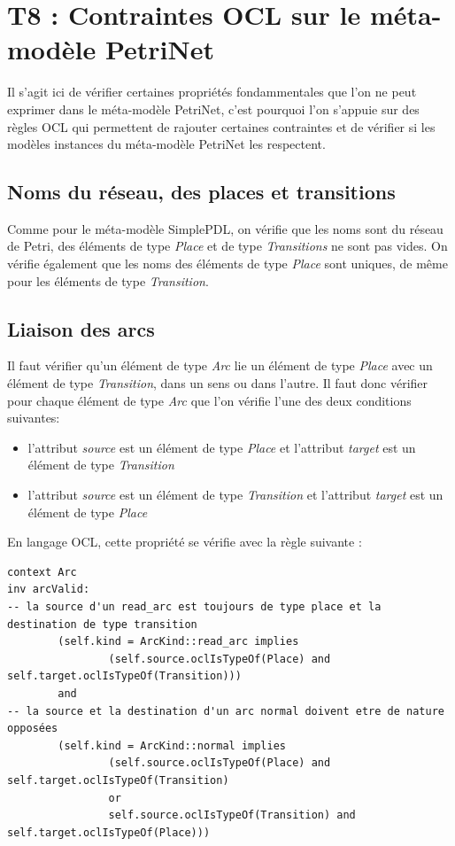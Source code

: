 \documentclass{report}
\begin{document}
\section{T8 : Contraintes OCL sur le méta-modèle PetriNet}
Il s'agit ici de vérifier certaines propriétés fondammentales que l'on ne peut exprimer dans le méta-modèle PetriNet, c'est pourquoi l'on s'appuie sur des règles OCL qui permettent de rajouter certaines contraintes et de vérifier si les modèles instances du méta-modèle PetriNet les respectent.\\

\subsection{Noms du réseau, des places et transitions}
Comme pour le méta-modèle SimplePDL, on vérifie que les noms sont du réseau de Petri, des éléments de type \textit{Place} et de type \textit{Transitions} ne sont pas vides. On vérifie également que les noms des éléments de type \textit{Place} sont uniques, de même pour les éléments de type \textit{Transition}.

\subsection{Liaison des arcs}
Il faut vérifier qu'un élément de type \textit{Arc} lie un élément de type \textit{Place} avec un élément de type \textit{Transition}, dans un sens ou dans l'autre. Il faut donc vérifier pour chaque élément de type \textit{Arc} que l'on vérifie l'une des deux conditions suivantes:
\begin{itemize}
\item l'attribut \textit{source} est un élément de type \textit{Place} et l'attribut \textit{target} est un élément de type \textit{Transition}
\item l'attribut \textit{source} est un élément de type \textit{Transition} et l'attribut \textit{target} est un élément de type \textit{Place}
\end{itemize}
En langage OCL, cette propriété se vérifie avec la règle suivante :

\begin{verbatim}
context Arc
inv arcValid:
-- la source d'un read_arc est toujours de type place et la destination de type transition
        (self.kind = ArcKind::read_arc implies 
                (self.source.oclIsTypeOf(Place) and self.target.oclIsTypeOf(Transition)))
        and 
-- la source et la destination d'un arc normal doivent etre de nature opposées 
        (self.kind = ArcKind::normal implies 
                (self.source.oclIsTypeOf(Place) and self.target.oclIsTypeOf(Transition)
                or
                self.source.oclIsTypeOf(Transition) and self.target.oclIsTypeOf(Place)))
\end{verbatim}
\end{document}
